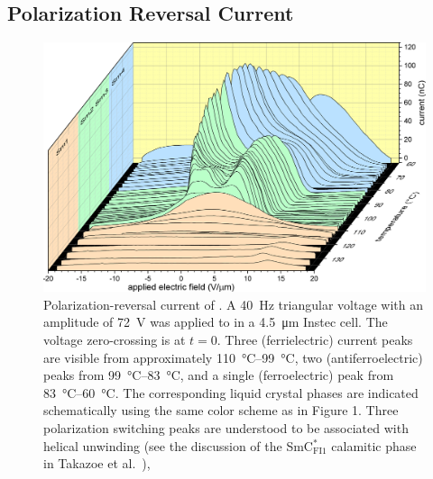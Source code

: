 \subsection{Polarization Reversal Current}
\begin{figure}[h!]
    \centering
    \includegraphics[width=.8\textwidth]{./figs/pal30/finalFigs/polzv9.png}
    \caption{\label{fig:pal30-prc}Polarization-reversal current of .
            A \SI{40}{\hertz} triangular voltage  
                with an amplitude of \SI{72}{\volt} was applied to  
                    in a \SI{4.5}{\micro\metre} Instec cell. The voltage
                    zero-crossing
                        is at $t=0$. Three
                            (ferrielectric) current peaks are visible from
                                approximately \SIrange{110}{99}{\degreeCelsius},
                                two
                                    (antiferroelectric) peaks from
                                    \SIrange{99}{83}{\degreeCelsius}, and a
                                        single (ferroelectric) peak from
                                        \SIrange{83}{60}{\degreeCelsius}.
                                            The corresponding liquid crystal
                                            phases are indicated schematically
                                            using
                                            the same color scheme as in Figure
                                            1. Three polarization switching
                                            peaks are understood to
                                            be associated with helical unwinding
                                            (see the discussion of the
                                            SmC$^{*}_\textrm{FI1}$ calamitic
                                            phase in Takazoe et
                                            al.~\cite{takezoe2010antiferroelectric}),
}
\end{figure}
